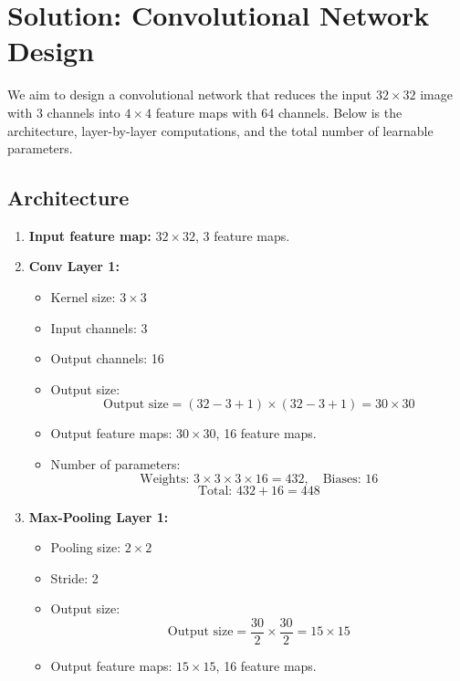 \section*{Solution: Convolutional Network Design}

We aim to design a convolutional network that reduces the input \( 32 \times 32 \) image with 3 channels into \( 4 \times 4 \) feature maps with 64 channels. Below is the architecture, layer-by-layer computations, and the total number of learnable parameters.

\subsection*{Architecture}
\begin{enumerate}
    \item \textbf{Input feature map:} \( 32 \times 32 \), 3 feature maps.

    \item \textbf{Conv Layer 1:}
    \begin{itemize}
        \item Kernel size: \( 3 \times 3 \)
        \item Input channels: 3
        \item Output channels: 16
        \item Output size:
        \[
        \text{Output size} = (32 - 3 + 1) \times (32 - 3 + 1) = 30 \times 30
        \]
        \item Output feature maps: \( 30 \times 30 \), 16 feature maps.
        \item Number of parameters:
        \[
        \text{Weights: } 3 \times 3 \times 3 \times 16 = 432, \quad \text{Biases: } 16
        \]
        \[
        \text{Total: } 432 + 16 = 448
        \]
    \end{itemize}

    \item \textbf{Max-Pooling Layer 1:}
    \begin{itemize}
        \item Pooling size: \( 2 \times 2 \)
        \item Stride: 2
        \item Output size:
        \[
        \text{Output size} = \frac{30}{2} \times \frac{30}{2} = 15 \times 15
        \]
        \item Output feature maps: \( 15 \times 15 \), 16 feature maps.
    \end{itemize}


\end{enumerate}
